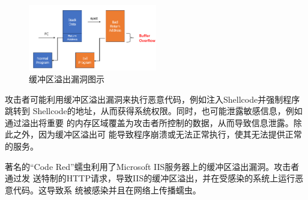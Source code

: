 \begin{figure}[htbp]
  \centering
  \includegraphics[width=0.5\textwidth]{pictures/Buffer Overflow.png}
  \caption{缓冲区溢出漏洞图示}
  \label{fig:BO}
\end{figure}
	
攻击者可能利用缓冲区溢出漏洞来执行恶意代码，例如注入Shellcode并强制程序跳转到
Shellcode的地址，从而获得系统权限。同时，也可能泄露敏感信息，例如通过溢出将重要
的内存区域覆盖为攻击者所控制的数据，从而导致信息泄露。除此之外，因为缓冲区溢出可
能导致程序崩溃或无法正常执行，使其无法提供正常的服务。

著名的``Code Red''蠕虫利用了Microsoft IIS服务器上的缓冲区溢出漏洞。攻击者通过发
送特制的HTTP请求，导致IIS的缓冲区溢出，并在受感染的系统上运行恶意代码。这导致系
统被感染并且在网络上传播蠕虫。
	
